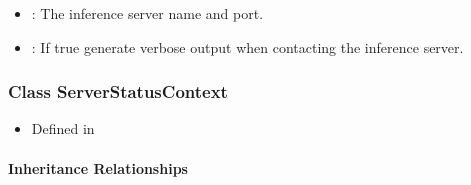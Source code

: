 \documentclass[letterpaper,10pt,english]{sphinxmanual}
\begin{document}
\begin{fulllineitems}
\begin{fulllineitems}
\begin{description}
\begin{itemize}
\item {} 
: The inference server name and port. 

\item {} 
: If true generate verbose output when contacting the inference server. 

\end{itemize}

\end{description}


\end{fulllineitems}


\end{fulllineitems}



\subsubsection{Class ServerStatusContext}
\label{\detokenize{cpp_api/classnvidia_1_1inferenceserver_1_1client_1_1ServerStatusContext:class-serverstatuscontext}}\label{\detokenize{cpp_api/classnvidia_1_1inferenceserver_1_1client_1_1ServerStatusContext:exhale-class-classnvidia-1-1inferenceserver-1-1client-1-1serverstatuscontext}}\label{\detokenize{cpp_api/classnvidia_1_1inferenceserver_1_1client_1_1ServerStatusContext::doc}}\begin{itemize}
\item {} 
Defined in {\hyperref[\detokenize{cpp_api/file_src_clients_c++_request.h:file-src-clients-c-request-h}]{}}

\end{itemize}


\paragraph{Inheritance Relationships}
\label{\detokenize{cpp_api/classnvidia_1_1inferenceserver_1_1client_1_1ServerStatusContext:inheritance-relationships}}
\end{document}

